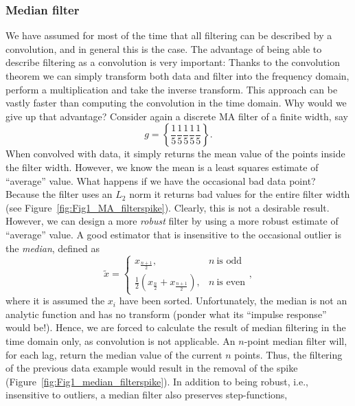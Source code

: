 \subsubsection{Median filter}
	We have assumed for most of the time that all filtering can be described by a
convolution, and in general this is the case. The advantage of being able to describe
filtering as a convolution is very important: Thanks to the convolution theorem we can
simply transform both data and filter into the frequency domain, perform a multiplication
and take the inverse transform. This approach can be vastly faster than computing the convolution
in the time domain.  Why would we give up that advantage? Consider again a discrete
MA filter of a finite width, say
$$
g = \left \{ \frac{1}{5} \frac{1}{5} \frac{1}{5} \frac{1}{5} \frac{1}{5} \right \}.
$$
When convolved with data, it simply returns the mean value of the points inside the filter
width. However, we know the mean is a least squares estimate of ``average'' value. What
happens if we have the occasional bad data point? Because the filter uses an $L_2$ norm it returns bad values for
the entire filter width (see Figure~\ref{fig:Fig1_MA_filterspike}).
Clearly, this is not a desirable result. However, we can design a more \emph{robust} filter by
using a more robust estimate of ``average'' value. A good estimator that is insensitive
to the occasional outlier is the \emph{median}, defined as
$$
\tilde{x} = \left\{ \begin{array}{cl}
x_{\frac{n+1}{2}}, & n \ \mbox{is odd}\\
\frac{1}{2} \left ( x_{\frac{n}{2}} + x_{\frac{n+1}{2}} \right), & n \ \mbox{is even}
\end{array} \right.,
$$
where it is assumed the $x_i$ have been sorted.
Unfortunately, the median is not an analytic function and has no transform (ponder what
its ``impulse response'' would be!). Hence, we are forced to calculate the result of median
filtering in the time domain only, as convolution is not applicable. An $n$-point median
filter will, for each lag, return the median value of the current $n$ points. Thus, the filtering
of the previous data example would result in the removal of the spike (Figure~\ref{fig:Fig1_median_filterspike}).
In addition to being robust, i.e., insensitive to outliers, a median filter also preserves step-functions,
